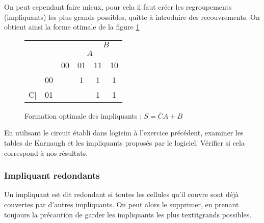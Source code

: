 \documentclass[a4paper,11pt]{book}
\theoremstyle{definition}
\theoremstyle{definition}
\begin{document}
On peut cependant faire mieux, pour cela il faut créer les regroupements (impliquants) les plus grands possibles, quitte à introduire des recouvrements. On obtient ainsi la forme otimale de la figure \ref{tab:karnaughEx1.3}
\begin{figure}
  \centering
  \begin{tabular}{|cc|c|c|c|c|}
    \hline
         & & \multicolumn{2}{c}{} & \multicolumn{2}{c|}{\underline{$\:\:\:B\:\:\:$}} \\
         & & \multicolumn{1}{c}{}& \multicolumn{2}{c}{\underline{$\:\:\:A\:\:\:$}} & \\
         & &  00 & 01 & 11 & 10 \\
    \hline 
         & 00 &  & \cellcolor{red!25}1 & \cellcolor{purple!50}1 & \cellcolor{blue!25}1\\
    \cline{2-6}
         C| & 01 & & & \cellcolor{blue!25}1 & \cellcolor{blue!25}1\\
    \hline
  \end{tabular}
  \caption{Formation optimale des impliquants : $S=\overline{C}A+B$}
  \label{tab:karnaughEx1.3}
\end{figure}

\begin{exercise}
En utilisant le circuit établi dans logisim à l'exercice précédent, examiner les tables de Karnaugh et les impliquants proposés par le logiciel. Vérifier si cela correspond à nos résultats.

\end{exercise}

\subsubsection{Impliquant redondants}
Un impliquant est dit redondant si toutes les cellules qu'il couvre sont déjà couvertes par d'autres impliquants. On peut alors le supprimer, en prenant toujours la précaution de garder les impliquants les plus textit{grands} possibles.
\end{document}
